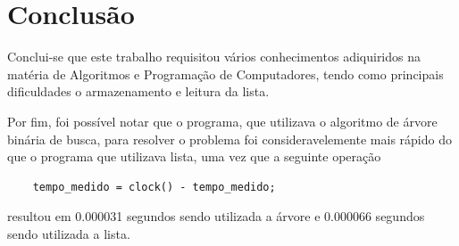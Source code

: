 \documentclass[12 pt, a4paper]{article}
\begin{document}
\newpage
\section {Conclus\~ao}
	Conclui-se que este trabalho requisitou v\'arios conhecimentos adiquiridos na mat\'eria de Algoritmos e Programa\c{c}\~ao de Computadores, tendo como principais dificuldades o armazenamento e leitura da lista.



    Por fim, foi poss\'ivel notar que o programa, que utilizava o algoritmo de \'arvore bin\'aria de busca, para resolver o problema foi consideravelemente mais r\'apido do que o programa que utilizava lista, uma vez que a seguinte opera\c{c}\~ao 

	\begin{lstlisting}
	tempo_medido = clock() - tempo_medido;
	\end{lstlisting}

	resultou em  0.000031 segundos sendo utilizada a \'arvore e 0.000066 segundos sendo utilizada a lista.

\newpage
{}




\nocite{*}
\end{document}
